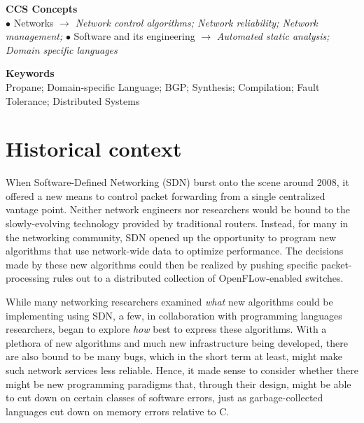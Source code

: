 \documentclass[10pt]{sigalternate052015}
\begin{document}
\vspace{0.1in}
\noindent
\textbf{CCS Concepts}\\
$\bullet$ Networks $\rightarrow$ {\em Network control algorithms; Network reliability; Network management;} 
$\bullet$ Software and its engineering $\rightarrow$ {\em Automated static analysis; Domain specific languages}

\vspace{0.1in}
\noindent
\textbf{Keywords}\\
Propane; Domain-specific Language; BGP; Synthesis; Compilation; Fault Tolerance; Distributed Systems




\section{Historical context}

When Software-Defined Networking (SDN) burst onto the scene around 2008,
it offered a new means to control packet forwarding  from a single
centralized vantage point.  Neither network engineers nor 
researchers would be bound to the slowly-evolving technology provided by
traditional routers.  Instead, for many in the networking
community, SDN opened up the opportunity to program new
algorithms that use network-wide data to optimize performance.
The decisions made by these new algorithms could then be realized by
pushing specific packet-processing rules out to a distributed
collection of  OpenFLow-enabled switches.

While many networking researchers examined \emph{what} new algorithms
could be implementing using SDN, a few, in collaboration
with programming languages researchers, began to explore \emph{how}
best to express these algorithms.  With a plethora of new algorithms
and much new infrastructure being developed, there are also bound to
be many bugs, which in the short term at least, might make such network
services less reliable.  Hence, it made sense to consider
whether there might be new programming paradigms that, through their
design, might be able to cut down on certain classes of software
errors, just as garbage-collected languages cut
down on memory errors relative to C.
\end{document}
